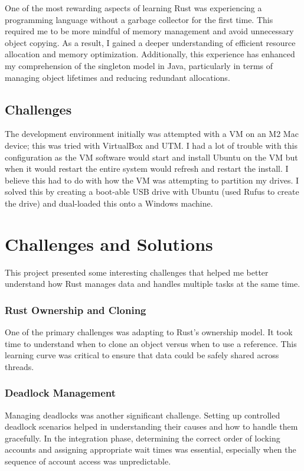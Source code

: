 \documentclass[conference]{report}
\begin{document}
One of the most rewarding aspects of learning Rust was experiencing a programming language without a garbage collector for the first time. This required me to be more mindful of memory management and avoid unnecessary object copying. As a result, I gained a deeper understanding of efficient resource allocation and memory optimization. Additionally, this experience has enhanced my comprehension of the singleton model in Java, particularly in terms of managing object lifetimes and reducing redundant allocations.

\section*{Challenges}
The development environment initially was attempted with a VM on an M2 Mac device; this was tried with VirtualBox and UTM. I had a lot of trouble with this configuration as the VM software would start and install Ubuntu on the VM but when it would restart the entire system would refresh and restart the install. I believe this had to do with how the VM was attempting to partition my drives. I solved this by creating a boot-able USB drive with Ubuntu (used Rufus to create the drive) and dual-loaded this onto a Windows machine.

\chapter{Challenges and Solutions}

This project presented some interesting challenges that helped me better understand how Rust manages data and handles multiple tasks at the same time.

\subsection*{Rust Ownership and Cloning}
One of the primary challenges was adapting to Rust's ownership model. It took time to understand when to clone an object versus when to use a reference. This learning curve was critical to ensure that data could be safely shared across threads.

\subsection*{Deadlock Management}
Managing deadlocks was another significant challenge. Setting up controlled deadlock scenarios helped in understanding their causes and how to handle them gracefully. In the integration phase, determining the correct order of locking accounts and assigning appropriate wait times was essential, especially when the sequence of account access was unpredictable.
\end{document}
